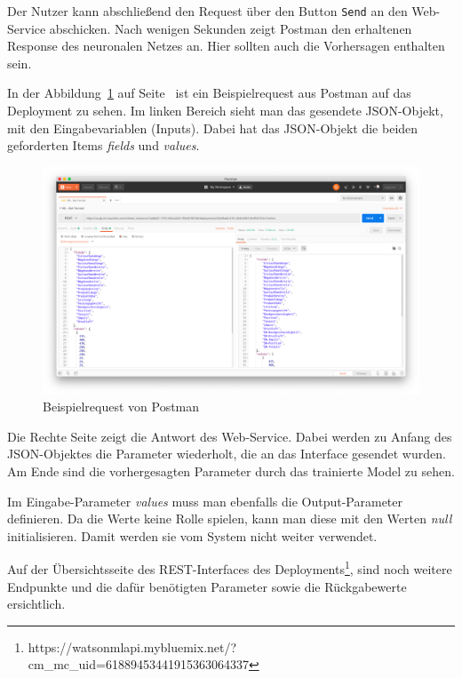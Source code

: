 Der Nutzer kann abschließend den Request über den Button \texttt{Send} an den Web-Service abschicken. Nach wenigen
Sekunden zeigt Postman den erhaltenen Response des neuronalen Netzes an. Hier sollten auch die Vorhersagen enthalten
sein.

In der Abbildung~\ref{fig:umsetzung_deployment_postman} auf Seite~\pageref{fig:umsetzung_deployment_postman} ist ein
Beispielrequest aus Postman auf das Deployment zu sehen. Im linken Bereich sieht man das gesendete JSON-Objekt, mit den
Eingabevariablen (Inputs). Dabei hat das JSON-Objekt die beiden geforderten Items \textit{fields} und \textit{values}.

\begin{figure}[h]
    \centering
    \includegraphics[width=\textwidth]{images/kapitel_3/deployment_postman.png}
    \caption{Beispielrequest von Postman}
    \label{fig:umsetzung_deployment_postman}
\end{figure}

Die Rechte Seite zeigt die Antwort des Web-Service. Dabei werden zu Anfang des JSON-Objektes die Parameter wiederholt,
die an das Interface gesendet wurden. Am Ende sind die vorhergesagten Parameter durch das trainierte Model zu sehen.

Im Eingabe-Parameter \textit{values} muss man ebenfalls die Output-Parameter definieren. Da die Werte keine Rolle
spielen, kann man diese mit den Werten \textit{null} initialisieren. Damit werden sie vom System nicht weiter verwendet.

Auf der Übersichtsseite des REST-Interfaces des
Deployments\footnote{https://watson\-ml\-api.mybluemix.net/?cm\_mc\_uid=61889453441915363064337}, sind noch weitere
Endpunkte und die dafür benötigten Parameter sowie die Rückgabewerte ersichtlich.

